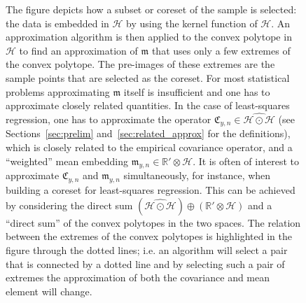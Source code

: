 \documentclass[AHL,Unicode,longabstracts,published]{cedram}
\theoremstyle{remark}
\newcommand{\R}{\mathbb{R}}
\newcommand{\dR}{{\R'}}
\newcommand{\cH}{\mathcal{H}}
\newcommand{\fkC}{\mathfrak{C}}
\newcommand{\mean}{\mathfrak{m}}
\begin{document}
\begin{figure}[!h]
{ The figure depicts how a subset or coreset of the sample is selected: the data is embedded in $\cH$ by using the kernel function of $\cH$. An approximation algorithm is then applied to the convex polytope in $\cH$ to find an approximation of $\mean$ that uses only a few extremes of the convex polytope. The pre-images of these extremes are the sample points that are selected as the coreset.  For most statistical problems approximating $\mean$ itself is insufficient and one has to approximate closely related quantities. In the case of least-squares regression, one has to approximate the operator $\fkC_{y,n} \in \widehat{\cH \odot \cH}$ (see Sections~\ref{sec:prelim} and~\ref{sec:related_approx} for the definitions), which is closely related to the empirical covariance operator, and a ``weighted'' mean embedding $\mean_{y,n} \in \dR \otimes \cH$. It is often of interest to approximate $\fkC_{y,n}$ and $\mean_{y,n}$ simultaneously, for instance, when building a coreset for least-squares regression. This can be achieved by considering the direct sum $(\widehat{\cH \odot \cH}) \oplus (\dR \otimes \cH)$ and a ``direct sum'' of the convex polytopes in the two spaces. The relation between the extremes of the convex polytopes is highlighted in the figure through the dotted lines; i.e. an algorithm will select a pair that is connected by a dotted line and by selecting such a pair of extremes the approximation of both the covariance and mean element will change.}
\end{figure}
\end{document}
